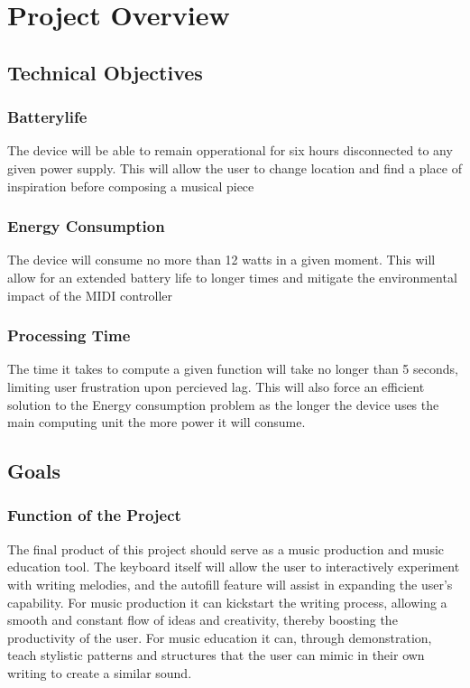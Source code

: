 \section{Project Overview}

\subsection{Technical Objectives}

\subsubsection{Batterylife}

The device will be able to remain opperational for six hours disconnected to any
given power supply. This will allow the user to change location and find a place
of inspiration before composing a musical piece

\subsubsection{Energy Consumption}

The device will consume no more than 12 watts in a given moment. This will allow
for an extended battery life to longer times and mitigate the environmental
impact of the MIDI controller

\subsubsection{Processing Time}

The time it takes to compute a given function will take no longer than 5
seconds, limiting user frustration upon percieved lag. This will also force an
efficient solution to the Energy consumption problem as the longer the device
uses the main computing unit the more power it will consume.

\subsection{Goals}

\subsubsection{Function of the Project}

The final product of this project should serve as a music production and music
education tool. The keyboard itself will allow the user to interactively experiment with
writing melodies, and the autofill feature will assist in expanding the user’s capability.
For music production it can kickstart the writing process, allowing a smooth and
constant flow of ideas and creativity, thereby boosting the productivity of the user.
For music education it can, through demonstration, teach stylistic patterns and
structures that the user can mimic in their own writing to create a similar sound.

